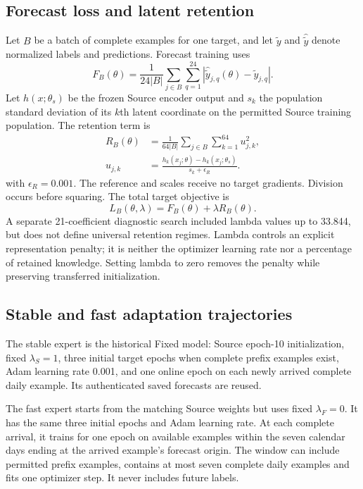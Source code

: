 \documentclass[pdflatex,iicol,sn-mathphys-num]{sn-jnl}
\begin{document}
\subsection{Forecast loss and latent retention}
Let $B$ be a batch of complete examples for one target, and let $\widetilde y$ and $\widehat{\widetilde y}$ denote normalized labels and predictions. Forecast training uses
\begin{equation}
F_B(\theta)=\frac{1}{24|B|}\sum_{j\in B}\sum_{q=1}^{24}
\left|\widehat{\widetilde y}_{j,q}(\theta)-\widetilde y_{j,q}\right|.
\label{eq:forecastloss}\end{equation}
Let $h(x;\theta_s)$ be the frozen Source encoder output and $s_k$ the population standard deviation of its $k$th latent coordinate on the permitted Source training population. The retention term is
\begin{equation}\begin{aligned}
R_B(\theta)&=\frac{1}{64|B|}\sum_{j\in B}\sum_{k=1}^{64}u_{j,k}^{2},\\
u_{j,k}&=\frac{h_k(x_j;\theta)-h_k(x_j;\theta_s)}{s_k+\epsilon_R}.
\end{aligned}\label{eq:retention}\end{equation}
with $\epsilon_R=0.001$. The reference and scales receive no target gradients. Division occurs before squaring. The total target objective is
\begin{equation}
L_B(\theta,\lambda)=F_B(\theta)+\lambda R_B(\theta).
\label{eq:total}\end{equation}
A separate 21-coefficient diagnostic search included lambda values up to 33.844, but does not define universal retention regimes. Lambda controls an explicit representation penalty; it is neither the optimizer learning rate nor a percentage of retained knowledge. Setting lambda to zero removes the penalty while preserving transferred initialization.

\subsection{Stable and fast adaptation trajectories}
The stable expert is the historical Fixed model: Source epoch-10 initialization, fixed $\lambda_S=1$, three initial target epochs when complete prefix examples exist, Adam learning rate 0.001, and one online epoch on each newly arrived complete daily example. Its authenticated saved forecasts are reused.

The fast expert starts from the matching Source weights but uses fixed $\lambda_F=0$. It has the same three initial epochs and Adam learning rate. At each complete arrival, it trains for one epoch on available examples within the seven calendar days ending at the arrived example's forecast origin. The window can include permitted prefix examples, contains at most seven complete daily examples and fits one optimizer step. It never includes future labels.
\end{document}
